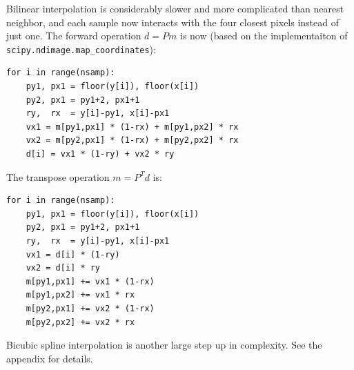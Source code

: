 \documentclass{article}
\newcommand{\code}[1]{\texttt{#1}}
\begin{document}
Bilinear interpolation is considerably slower and more complicated than nearest neighbor,
and each sample now interacts with the four closest pixels instead of just one.
The forward operation $d=Pm$ is now (based on the implementaiton of \code{scipy.ndimage.map\_coordinates}):
\begin{lstlisting}
for i in range(nsamp):
	py1, px1 = floor(y[i]), floor(x[i])
	py2, px1 = py1+2, px1+1
	ry,  rx  = y[i]-py1, x[i]-px1
	vx1 = m[py1,px1] * (1-rx) + m[py1,px2] * rx
	vx2 = m[py2,px1] * (1-rx) + m[py2,px2] * rx
	d[i] = vx1 * (1-ry) + vx2 * ry
\end{lstlisting}
The transpose operation $m=P^Td$ is:
\begin{lstlisting}
for i in range(nsamp):
	py1, px1 = floor(y[i]), floor(x[i])
	py2, px1 = py1+2, px1+1
	ry,  rx  = y[i]-py1, x[i]-px1
	vx1 = d[i] * (1-ry)
	vx2 = d[i] * ry
	m[py1,px1] += vx1 * (1-rx)
	m[py1,px2] += vx1 * rx
	m[py2,px1] += vx2 * (1-rx)
	m[py2,px2] += vx2 * rx
\end{lstlisting}
Bicubic spline interpolation is another large step up in complexity. See the appendix for details.
\end{document}
